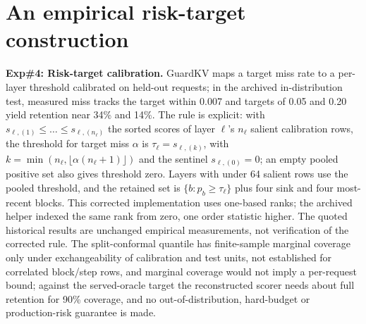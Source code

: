 \section{An empirical risk-target construction}
\label{sec:guardkv}
\textbf{Exp\#4: Risk-target calibration.} GuardKV maps a target miss rate to a
per-layer threshold calibrated on held-out requests; in the archived
in-distribution test, measured miss tracks the target within 0.007 and targets of
0.05 and 0.20 yield retention near 34\% and 14\%. The rule is explicit: with $s_{\ell,(1)}\le\dots\le s_{\ell,(n_\ell)}$ the sorted
scores of layer $\ell$'s $n_\ell$ salient calibration rows, the threshold for target
miss $\alpha$ is $\tau_\ell=s_{\ell,(k)}$, with
$k=\min(n_\ell,\lfloor\alpha(n_\ell+1)\rfloor)$ and the sentinel
$s_{\ell,(0)}=0$; an empty pooled positive set also gives threshold zero.
Layers with under 64 salient rows use the pooled threshold, and the retained set is
$\{b:p_b\ge\tau_\ell\}$ plus four sink and four most-recent blocks. This
corrected implementation uses one-based ranks; the archived helper indexed the
same rank from zero, one order statistic higher. The quoted historical results
are unchanged empirical measurements, not verification of the corrected rule.
The split-conformal quantile has finite-sample marginal coverage only under
exchangeability of calibration and test units, not established for correlated
block/step rows, and marginal coverage would not imply a per-request bound; against
the served-oracle target the reconstructed scorer needs about full retention for
90\% coverage, and no out-of-distribution, hard-budget or production-risk guarantee
is made.
